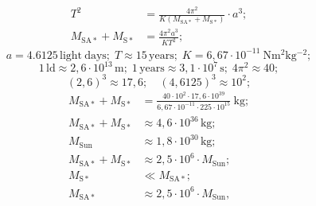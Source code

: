\begin{description}
  \begin{align*}
    T^2 &= \frac{4\pi^2}{K(M_{\mathrm{SA}*} + M_{\mathrm{S}*})}\cdot a^3;\\
    M_{\mathrm{SA}*} + M_{\mathrm{S}*} &= \frac{4\pi^2 a^3}{KT^2};
  \end{align*}
  \[
    a = 4.6125\,\mathrm{light\ days};\;
    T \approx 15\,\mathrm{years};\;
    K = 6{,}67\cdot10^{-11}\ \mathrm{Nm^2kg^{-2}};
  \]
  \[
    1\,\mathrm{ld} \approx 2{,}6\cdot10^{13}\,\mathrm{m};\;
    1\,\mathrm{years} \approx 3{,}1\cdot10^{7}\,\mathrm{s};\;
    4\pi^2 \approx 40;
  \]
  \[
    (2{,}6)^3 \approx 17{,}6;\quad (4{,}6125)^3 \approx 10^2;
  \]
  \begin{align*}
    M_{\mathrm{SA}*} + M_{\mathrm{S}*}
      &= \frac{40\cdot10^{2}\cdot17{,}6\cdot10^{39}}
              {6{,}67\cdot10^{-11}\cdot225\cdot10^{15}}\ \mathrm{kg};\\
    M_{\mathrm{SA}*} + M_{\mathrm{S}*} &\approx 4{,}6\cdot10^{36}\,\mathrm{kg};\\
    M_{\mathrm{Sun}} &\approx 1{,}8\cdot10^{30}\,\mathrm{kg};
    \\
    M_{\mathrm{SA}*} + M_{\mathrm{S}*}
      &\approx 2{,}5\cdot10^{6}\cdot M_{\mathrm{Sun}};\\
    M_{\mathrm{S}*} &\ll M_{\mathrm{SA}*};\\
    M_{\mathrm{SA}*} &\approx 2{,}5\cdot10^{6}\cdot M_{\mathrm{Sun}},
  \end{align*}
\end{description}
